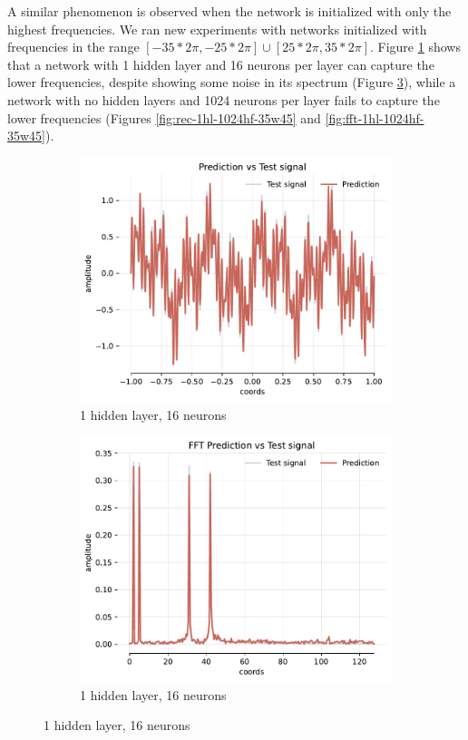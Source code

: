 A similar phenomenon is observed when the network is initialized with only the highest frequencies. We ran new experiments with networks initialized with frequencies in the range $[-35*2\pi, -25*2\pi] \cup [25*2\pi, 35*2\pi]$. Figure \ref{fig:rec-1hl-16hf-35w45} shows that a network with 1 hidden layer and 16 neurons per layer can capture the lower frequencies, despite showing some noise in its spectrum (Figure \ref{fig:fft-1hl-16hf-35w45}), while a network with no hidden layers and 1024 neurons per layer fails to capture the lower frequencies (Figures \ref{fig:rec-1hl-1024hf-35w45} and \ref{fig:fft-1hl-1024hf-35w45}).

\begin{figure}
    \centering
    \begin{subfigure}[b]{0.40\textwidth}
        \centering
        \includegraphics[width=\textwidth]{img/ch4/prediction_1hl_16hf_35w45.pdf}
        \caption{1 hidden layer, 16 neurons}
        \label{fig:rec-1hl-16hf-35w45}
    \end{subfigure}
    \begin{subfigure}[b]{0.40\textwidth}
        \centering
        \includegraphics[width=\textwidth]{img/ch4/fft_1hl_16hf_35w45.pdf}
        \caption{1 hidden layer, 16 neurons}
        \label{fig:fft-1hl-16hf-35w45}
    \end{subfigure}
    

\end{figure}
